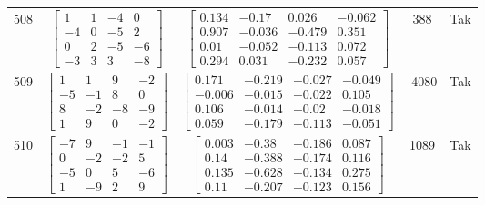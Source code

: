 \documentclass[a4paper,12pt]{article}
\begin{document}
\begin{tabular}{c c c c c}
508
&
$\begin{bmatrix} 1 & 1 & -4 & 0 \\ -4 & 0 & -5 & 2 \\ 0 & 2 & -5 & -6 \\ -3 & 3 & 3 & -8 \end{bmatrix}$
&
$\begin{bmatrix} 0.134 & -0.17 & 0.026 & -0.062 \\ 0.907 & -0.036 & -0.479 & 0.351 \\ 0.01 & -0.052 & -0.113 & 0.072 \\ 0.294 & 0.031 & -0.232 & 0.057 \end{bmatrix}$
&
388
&
Tak
\\
509
&
$\begin{bmatrix} 1 & 1 & 9 & -2 \\ -5 & -1 & 8 & 0 \\ 8 & -2 & -8 & -9 \\ 1 & 9 & 0 & -2 \end{bmatrix}$
&
$\begin{bmatrix} 0.171 & -0.219 & -0.027 & -0.049 \\ -0.006 & -0.015 & -0.022 & 0.105 \\ 0.106 & -0.014 & -0.02 & -0.018 \\ 0.059 & -0.179 & -0.113 & -0.051 \end{bmatrix}$
&
-4080
&
Tak
\\
510
&
$\begin{bmatrix} -7 & 9 & -1 & -1 \\ 0 & -2 & -2 & 5 \\ -5 & 0 & 5 & -6 \\ 1 & -9 & 2 & 9 \end{bmatrix}$
&
$\begin{bmatrix} 0.003 & -0.38 & -0.186 & 0.087 \\ 0.14 & -0.388 & -0.174 & 0.116 \\ 0.135 & -0.628 & -0.134 & 0.275 \\ 0.11 & -0.207 & -0.123 & 0.156 \end{bmatrix}$
&
1089
&
Tak
\\
\end{tabular} \egroup \newpage
\end{document}

